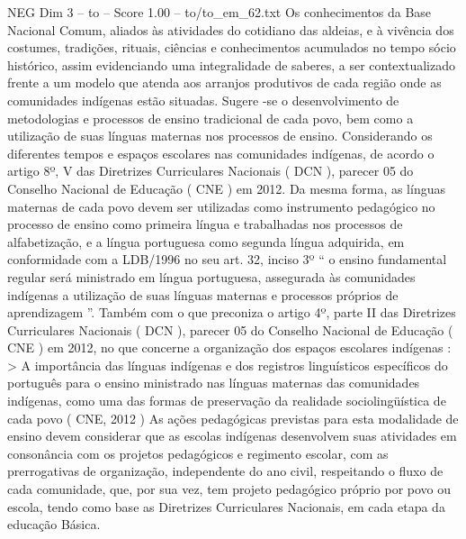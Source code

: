 \begin{textsample}{NEG Dim 3 – to – Score 1.00 – to/to\_em\_62.txt}
Os conhecimentos da Base Nacional Comum, aliados às atividades do cotidiano das aldeias, e à vivência dos costumes, tradições, rituais, ciências e conhecimentos acumulados no tempo sócio histórico, assim evidenciando uma integralidade de saberes, a ser contextualizado frente a um modelo que atenda aos arranjos produtivos de cada região onde as comunidades indígenas estão situadas.
Sugere -se o desenvolvimento de metodologias e processos de ensino tradicional de cada povo, bem como a utilização de suas línguas maternas nos processos de ensino.
Considerando os diferentes tempos e espaços escolares nas comunidades indígenas, de acordo o artigo 8º, V das Diretrizes Curriculares Nacionais ( DCN ), parecer 05 do Conselho Nacional de Educação ( CNE ) em 2012.
Da mesma forma, as línguas maternas de cada povo devem ser utilizadas como instrumento pedagógico no processo de ensino como primeira língua e trabalhadas nos processos de alfabetização, e a língua portuguesa como segunda língua adquirida, em conformidade com a LDB/1996 no seu art. 32, inciso 3º “ o ensino fundamental regular será ministrado em língua portuguesa, assegurada às comunidades indígenas a utilização de suas línguas maternas e processos próprios de aprendizagem ”.
Também com o que preconiza o artigo 4º, parte II das Diretrizes Curriculares Nacionais ( DCN ), parecer 05 do Conselho Nacional de Educação ( CNE ) em 2012, no que concerne a organização dos espaços escolares indígenas : > A importância das línguas indígenas e dos registros linguísticos específicos do português para o ensino ministrado nas línguas maternas das comunidades indígenas, como uma das formas de preservação da realidade sociolingüística de cada povo ( CNE, 2012 ) As ações pedagógicas previstas para esta modalidade de ensino devem considerar que as escolas indígenas desenvolvem suas atividades em consonância com os projetos pedagógicos e regimento escolar, com as prerrogativas de organização, independente do ano civil, respeitando o fluxo de cada comunidade, que, por sua vez, tem projeto pedagógico próprio por povo ou escola, tendo como base as Diretrizes Curriculares Nacionais, em cada etapa da educação Básica.

\end{textsample}
